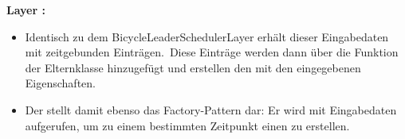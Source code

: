\textbf{Layer :}
\begin{itemize}
    \item Identisch zu dem BicycleLeaderSchedulerLayer erhält dieser  Eingabedaten mit zeitgebunden Einträgen.~Diese Einträge werden dann über die Funktion  der Elternklasse  hinzugefügt und erstellen den  mit den eingegebenen Eigenschaften.
    \item Der  stellt damit ebenso das Factory-Pattern dar: Er wird mit Eingabedaten aufgerufen, um zu einem bestimmten Zeitpunkt einen  zu erstellen.
\end{itemize}
